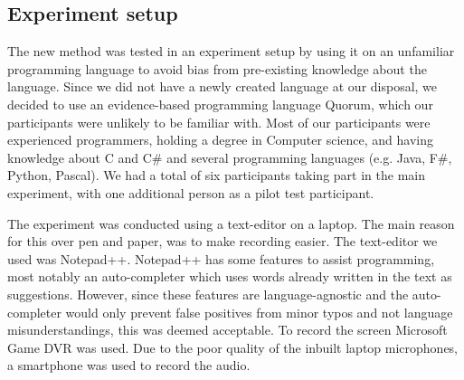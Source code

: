 \documentclass[preprint,10pt]{sigplanconf}
\begin{document}
\subsection{Experiment setup}
The new method was tested in an experiment setup by using it on an unfamiliar programming language to avoid bias from pre-existing knowledge about the language. Since we did not have a newly created language at our disposal, we decided to use an evidence-based programming language Quorum, which our participants were unlikely to be familiar with. Most of our participants were experienced programmers,  holding a degree in Computer science, and having knowledge about C and C\# and several programming languages (e.g. Java, F\#, Python, Pascal). We had a total of six participants taking part in the main experiment, with one additional person as a pilot test participant.

The experiment was conducted using a text-editor on a laptop.
The main reason for this over pen and paper, was to make recording easier.
The text-editor we used was Notepad++\cite{Notepad}.
Notepad++ has some features to assist programming, most notably an auto-completer which uses words already written in the text as suggestions.
However, since these features are language-agnostic and the auto-completer would only prevent false positives from minor typos and not language misunderstandings, this was deemed acceptable.
To record the screen Microsoft Game DVR was used.
Due to the poor quality of the inbuilt laptop microphones, a smartphone was used to record the audio.
\end{document}

